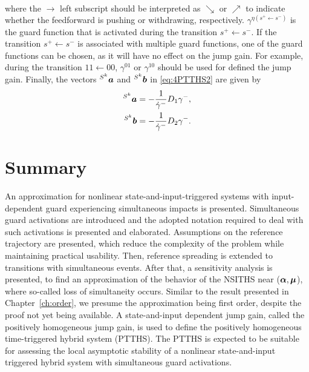 \documentclass[../DC2017114Bouma.tex]{subfiles}
\begin{document}
\begin{sloppypar}
\begin{mydef}[PTTHS]
\begin{align*}
\end{align*}
where the $\rightarrow$ left subscript should be interpreted as $\searrow$ or $\nearrow$ to indicate whether the feedforward is pushing or withdrawing, respectively. $\gamma^{\eta(s^+\leftarrow s^-)}$ is the guard function that is activated during the transition $s^+\leftarrow s^-$. If the transition $s^+\leftarrow s^-$ is associated with multiple guard functions, one of the guard functions can be chosen, as it will have no effect on the jump gain. For example, during the transition $11\leftarrow 00$, $\gamma^{01}$ or $\gamma^{10}$ should be used for defined the jump gain. Finally, the vectors $\hspace{0cm}^{S^k}{\boldsymbol{a}}$ and $\hspace{0cm}^{S^k}{\boldsymbol{b}}$ in \eqref{eq:4PTTHS2} are given by
\begin{align*}
\hspace{0cm}^{S^k}{\boldsymbol{a}} &= -\frac{1}{\dot{\gamma}^{-}}D_1\gamma^{-},\\
\hspace{0cm}^{S^k}{\boldsymbol{b}} &= -\frac{1}{\dot{\gamma}^{-}}D_2\gamma^{-}.
\end{align*}
\end{mydef}
\end{sloppypar}

%
%
%
%
%
%

\section{Summary}
An approximation for nonlinear state-and-input-triggered systems with input-dependent guard experiencing simultaneous impacts is presented. Simultaneous guard activations are introduced and the adopted notation required to deal with such activations is presented and elaborated. Assumptions on the reference trajectory are presented, which reduce the complexity of the problem while maintaining practical usability. Then, reference spreading is extended to transitions with simultaneous events. After that, a sensitivity analysis is presented, to find an approximation of the behavior of the NSITHS near ($\boldsymbol{\alpha},\boldsymbol{\mu}$), where so-called loss of simultaneity occurs. Similar to the result presented in Chapter~\ref{ch:order}, we presume the approximation being first order, despite the proof not yet being available. A state-and-input dependent jump gain, called the positively homogeneous jump gain, is used to define the positively homogeneous time-triggered hybrid system (PTTHS). The PTTHS is expected to be suitable for assessing the local asymptotic stability of a nonlinear state-and-input triggered hybrid system with simultaneous guard activations.
\end{document}

